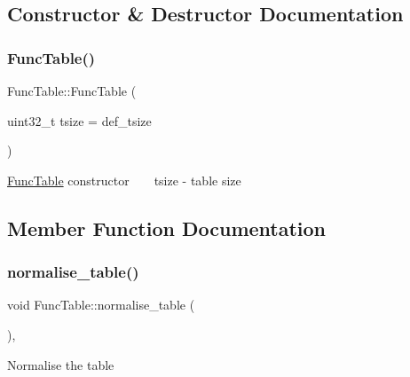 \subsection{Constructor \& Destructor Documentation}
\mbox{\label{class_func_table_ad76b1221806cebf553bfad4f8b39ac75}} 
\subsubsection{\texorpdfstring{Func\+Table()}{FuncTable()}}
{\footnotesize\ttfamily Func\+Table\+::\+Func\+Table (\begin{DoxyParamCaption}\item[{uint32\+\_\+t}]{tsize = {\ttfamily def\+\_\+tsize} }\end{DoxyParamCaption})\hspace{0.3cm}{\ttfamily [inline]}}

\hyperlink{class_func_table}{Func\+Table} constructor ~\newline
~\newline
tsize -\/ table size ~\newline


\subsection{Member Function Documentation}
\mbox{\label{class_func_table_af09474fb6b023d82597b940bf60ab71c}} 
\subsubsection{\texorpdfstring{normalise\+\_\+table()}{normalise\_table()}}
{\footnotesize\ttfamily void Func\+Table\+::normalise\+\_\+table (\begin{DoxyParamCaption}{ }\end{DoxyParamCaption})\hspace{0.3cm}{\ttfamily [inline]}, {\ttfamily [protected]}}

Normalise the table \mbox{\label{class_func_table_aad16cb2dbc27ffe7b3b6ed3715657cc4}} 
